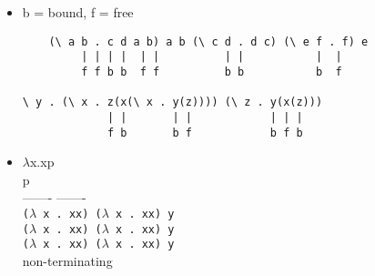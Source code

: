 \begin{itemize}
\item b = bound, f = free
\begin{verbatim}
    (\ a b . c d a b) a b (\ c d . d c) (\ e f . f) e
         | | | |  | |          | |           |  |
         f f b b  f f          b b           b  f

\ y . (\ x . z(x(\ x . y(z)))) (\ z . y(x(z)))
             | |       | |            | | |
             f b       b f            b f b
\end{verbatim}


\item 

$\lambda$x.xp \\
p \\
------- -------\\
\texttt{($\lambda$ x . xx) ($\lambda$ x . xx) y} \\
\texttt{($\lambda$ x . xx) ($\lambda$ x . xx) y} \\
\texttt{($\lambda$ x . xx) ($\lambda$ x . xx) y} \\
non-terminating \\



\end{itemize}